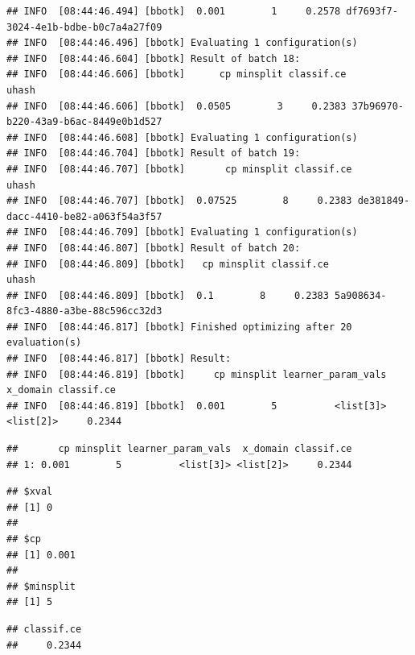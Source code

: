 \documentclass[
]{scrbook}
\newenvironment{Shaded}{\begin{snugshade}}{\end{snugshade}}
\newcommand{\NormalTok}[1]{#1}
\newcommand{\SpecialCharTok}[1]{\textcolor[rgb]{0.00,0.00,0.00}{#1}}
\renewenvironment{Shaded} {\begin{snugshade}\small} {\end{snugshade}}
\begin{document}
\begin{verbatim}
## INFO  [08:44:46.494] [bbotk]  0.001        1     0.2578 df7693f7-3024-4e1b-bdbe-b0c7a4a27f09 
## INFO  [08:44:46.496] [bbotk] Evaluating 1 configuration(s) 
## INFO  [08:44:46.604] [bbotk] Result of batch 18: 
## INFO  [08:44:46.606] [bbotk]      cp minsplit classif.ce                                uhash 
## INFO  [08:44:46.606] [bbotk]  0.0505        3     0.2383 37b96970-b220-43a9-b6ac-8449e0b1d527 
## INFO  [08:44:46.608] [bbotk] Evaluating 1 configuration(s) 
## INFO  [08:44:46.704] [bbotk] Result of batch 19: 
## INFO  [08:44:46.707] [bbotk]       cp minsplit classif.ce                                uhash 
## INFO  [08:44:46.707] [bbotk]  0.07525        8     0.2383 de381849-dacc-4410-be82-a063f54a3f57 
## INFO  [08:44:46.709] [bbotk] Evaluating 1 configuration(s) 
## INFO  [08:44:46.807] [bbotk] Result of batch 20: 
## INFO  [08:44:46.809] [bbotk]   cp minsplit classif.ce                                uhash 
## INFO  [08:44:46.809] [bbotk]  0.1        8     0.2383 5a908634-8fc3-4880-a3be-88c596cc32d3 
## INFO  [08:44:46.817] [bbotk] Finished optimizing after 20 evaluation(s) 
## INFO  [08:44:46.817] [bbotk] Result: 
## INFO  [08:44:46.819] [bbotk]     cp minsplit learner_param_vals  x_domain classif.ce 
## INFO  [08:44:46.819] [bbotk]  0.001        5          <list[3]> <list[2]>     0.2344
\end{verbatim}

\begin{verbatim}
##       cp minsplit learner_param_vals  x_domain classif.ce
## 1: 0.001        5          <list[3]> <list[2]>     0.2344
\end{verbatim}

\begin{Shaded}
\end{Shaded}

\begin{verbatim}
## $xval
## [1] 0
## 
## $cp
## [1] 0.001
## 
## $minsplit
## [1] 5
\end{verbatim}

\begin{Shaded}
\end{Shaded}

\begin{verbatim}
## classif.ce 
##     0.2344
\end{verbatim}
\end{document}
